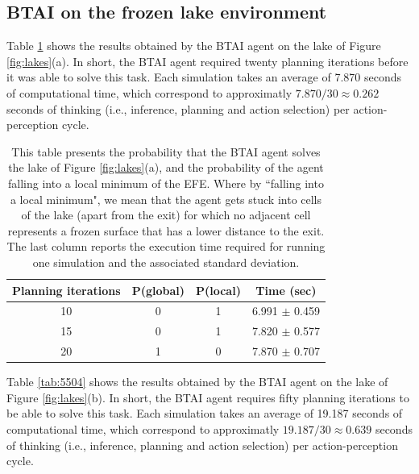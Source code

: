 \documentclass[twoside,11pt]{article}
\begin{document}
\subsection{BTAI on the frozen lake environment}

Table \ref{tab:5503} shows the results obtained by the BTAI agent on the lake of Figure \ref{fig:lakes}(a). In short, the BTAI agent required twenty planning iterations before it was able to solve this task. Each simulation takes an average of 7.870 seconds of computational time, which correspond to approximatly $7.870/30 \approx 0.262$ seconds of thinking (i.e., inference, planning and action selection) per action-perception cycle. 

\begin{table}[H]
\centering
\begin{tabular}{ |c|c|c|c| }
 \hline
 Planning iterations & P(global) & P(local) & Time (sec) \\
 \hline
 10 & 0 & 1 & 6.991 $\pm$ 0.459 \\
 \hline
 15 & 0 & 1 & 7.820 $\pm$ 0.577 \\
 \hline
 20 & 1 & 0 & 7.870 $\pm$ 0.707 \\
 \hline
\end{tabular}
\caption{This table presents the probability that the BTAI agent solves the lake of Figure \ref{fig:lakes}(a), and the probability of the agent falling into a local minimum of the EFE. Where by ``falling into a local minimum", we mean that the agent gets stuck into cells of the lake (apart from the exit) for which no adjacent cell represents a frozen surface that has a lower distance to the exit. The last column reports the execution time required for running one simulation and the associated standard deviation.}
\label{tab:5503}
\end{table}

Table \ref{tab:5504} shows the results obtained by the BTAI agent on the lake of Figure \ref{fig:lakes}(b). In short, the BTAI agent requires fifty planning iterations to be able to solve this task. Each simulation takes an average of 19.187 seconds of computational time, which correspond to approximatly $19.187/30 \approx 0.639$ seconds of thinking (i.e., inference, planning and action selection) per action-perception cycle. 
\end{document}

